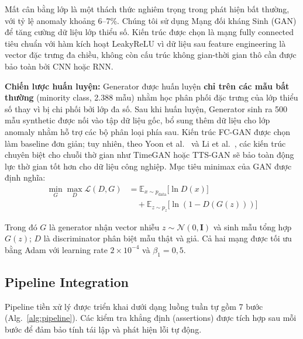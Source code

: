 Mất cân bằng lớp là một thách thức nghiêm trọng trong phát hiện bất thường,
với tỷ lệ anomaly khoảng 6--7\%.
Chúng tôi sử dụng Mạng đối kháng Sinh (GAN) để tăng cường dữ liệu lớp thiểu số.
Kiến trúc được chọn là mạng fully connected tiêu chuẩn với hàm kích hoạt LeakyReLU
vì dữ liệu sau feature engineering là vector đặc trưng đa chiều,
không còn cấu trúc không gian-thời gian thô cần được bảo toàn bởi CNN hoặc RNN.


\textbf{Chiến lược huấn luyện:} Generator được huấn luyện \textbf{chỉ trên các mẫu bất thường} (minority class, 2.388 mẫu)
nhằm học phân phối đặc trưng của lớp thiểu số thay vì bị chi phối bởi lớp đa số.
Sau khi huấn luyện, Generator sinh ra 500 mẫu synthetic được nối vào tập dữ liệu gốc,
bổ sung thêm dữ liệu cho lớp anomaly nhằm hỗ trợ các bộ phân loại phía sau.
Kiến trúc FC-GAN được chọn làm baseline đơn giản;
tuy nhiên, theo Yoon et al.~\cite{yoon2019} và Li et al.~\cite{li2022ttsgan},
các kiến trúc chuyên biệt cho chuỗi thờ gian như TimeGAN hoặc TTS-GAN
sẽ bảo toàn động lực thờ gian tốt hơn cho dữ liệu công nghiệp.
Mục tiêu minimax của GAN được định nghĩa:
\begin{equation}
\begin{aligned}
\min_G \max_D \mathcal{L}(D,G)
&= \mathbb{E}_{x\sim p_{\text{data}}}\big[\ln D(x)\big] \\
&\quad + \mathbb{E}_{z\sim p_z}\big[\ln(1-D(G(z)))\big]
\end{aligned}
\label{eq:gan}
\end{equation}

Trong đó $G$ là generator nhận vector nhiễu $z \sim \mathcal{N}(0,\mathbf{I})$
và sinh mẫu tổng hợp $G(z)$; $D$ là discriminator phân biệt mẫu thật và giả.
Cả hai mạng được tối ưu bằng Adam với learning rate $2\times 10^{-4}$ và $\beta_1 = 0{,}5$.

\subsection{Pipeline Integration}

Pipeline tiền xử lý được triển khai dưới dạng luồng tuần tự gồm 7 bước (Alg.~\ref{alg:pipeline}).
Các kiểm tra khẳng định (assertions) được tích hợp sau mỗi bước
để đảm bảo tính tái lập và phát hiện lỗi tự động.

